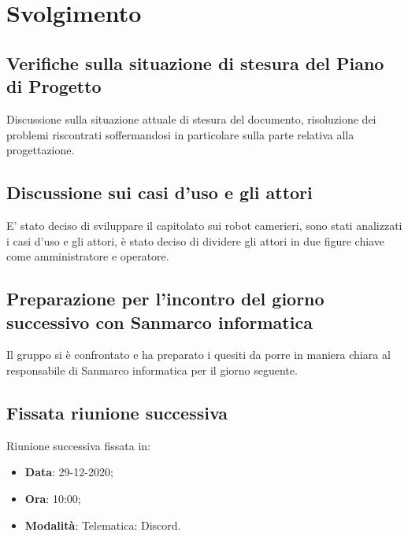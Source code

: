 \documentclass[]{article}
\begin{document}
	\newpage

	\section{Svolgimento}
		\subsection{Verifiche sulla situazione di stesura del Piano di Progetto}
		Discussione sulla situazione attuale di stesura del documento, risoluzione dei problemi riscontrati soffermandosi in particolare sulla parte relativa alla progettazione.

		\subsection{Discussione sui casi d'uso e gli attori }
		E' stato deciso di sviluppare il capitolato sui robot camerieri, sono stati analizzati i casi d'uso e gli attori, è stato deciso di dividere gli attori in due figure chiave come amministratore e operatore.
		
		\subsection{Preparazione per l'incontro del giorno successivo con Sanmarco informatica}
		Il gruppo si è confrontato e ha preparato i quesiti da porre in maniera chiara al responsabile di Sanmarco informatica per il giorno seguente.

		\subsection{Fissata riunione successiva}
		Riunione successiva fissata in:
		\begin{itemize}
			\item \textbf{Data}: 29-12-2020;
			\item \textbf{Ora}: 10:00;
			\item \textbf{Modalità}: Telematica: Discord.
		\end{itemize}
	
\end{document}
